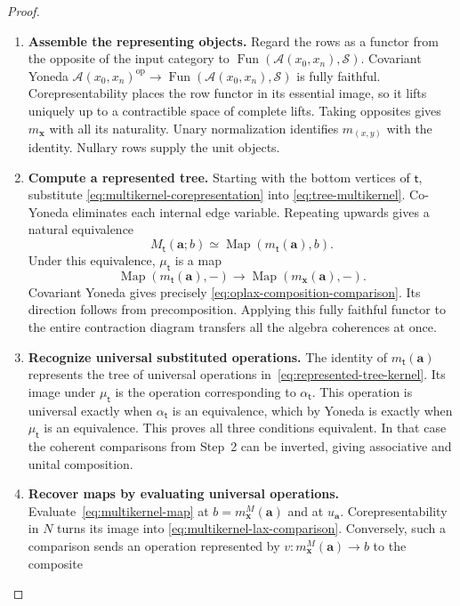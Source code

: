 \documentclass[oneside]{article}
\theoremstyle{plain}
\theoremstyle{definition}
\theoremstyle{remark}
\newcommand{\Fun}{\operatorname{Fun}}
\newcommand{\Map}{\operatorname{Map}}
\newcommand{\Sps}{\mathcal S}
\newcommand{\op}{\mathrm{op}}
\begin{document}
\begin{proof}
\leavevmode
\begin{enumerate}
\item \textbf{Assemble the representing objects.}
Regard the rows as a functor from the opposite of the input
category to
$\Fun(\mathcal A(x_0,x_n),\Sps)$.
Covariant Yoneda
$\mathcal A(x_0,x_n)^{\op}\to
\Fun(\mathcal A(x_0,x_n),\Sps)$ is fully faithful.
Corepresentability places the row functor in its essential image,
so it lifts uniquely up to a contractible space of complete lifts.
Taking opposites gives $m_{\mathbf x}$ with all its naturality.
Unary normalization identifies $m_{(x,y)}$ with the identity.
Nullary rows supply the unit objects.
\item \textbf{Compute a represented tree.}
Starting with the bottom vertices of $\mathsf t$, substitute
\eqref{eq:multikernel-corepresentation} into
\eqref{eq:tree-multikernel}. Co-Yoneda eliminates each internal
edge variable. Repeating upwards gives a natural equivalence
\begin{equation}\label{eq:represented-tree-kernel}
 M_{\mathsf t}(\mathbf a;b)
 \simeq\Map(m_{\mathsf t}(\mathbf a),b).
\end{equation}
Under this equivalence, $\mu_{\mathsf t}$ is a map
\[
 \Map(m_{\mathsf t}(\mathbf a),-)
 \longrightarrow\Map(m_{\mathbf x}(\mathbf a),-).
\]
Covariant Yoneda gives precisely
\eqref{eq:oplax-composition-comparison}. Its direction follows from
precomposition. Applying this fully faithful functor to the entire
contraction diagram transfers all the algebra coherences at once.
\item \textbf{Recognize universal substituted operations.}
The identity of $m_{\mathsf t}(\mathbf a)$ represents the tree
of universal operations in~\eqref{eq:represented-tree-kernel}.
Its image under $\mu_{\mathsf t}$ is the operation corresponding
to $\alpha_{\mathsf t}$. This operation is universal exactly when
$\alpha_{\mathsf t}$ is an equivalence, which by Yoneda is exactly
when $\mu_{\mathsf t}$ is an equivalence. This proves all three
conditions equivalent. In that case the coherent comparisons from
Step~2 can be inverted, giving associative and unital composition.
\item \textbf{Recover maps by evaluating universal operations.}
Evaluate~\eqref{eq:multikernel-map} at
$b=m^M_{\mathbf x}(\mathbf a)$ and at $u_{\mathbf a}$.
Corepresentability in $N$ turns its image into
\eqref{eq:multikernel-lax-comparison}. Conversely, such a comparison
sends an operation represented by
$v:m^M_{\mathbf x}(\mathbf a)\to b$ to the composite

\end{enumerate}
\end{proof}
\end{document}
